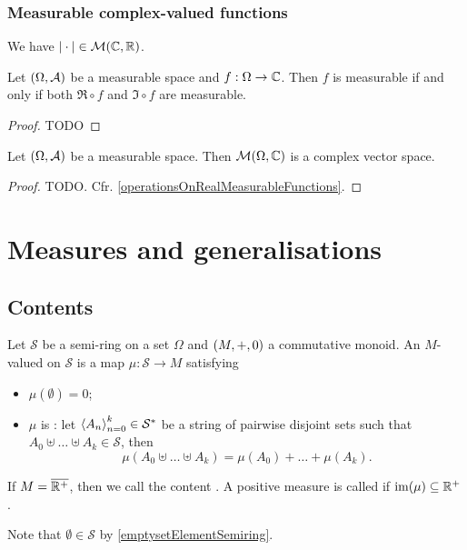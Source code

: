 \subsubsection{Measurable complex-valued functions}

\begin{lemma} \label{modulusMeasurable}
We have $|\cdot| \in \operatorname{\mathcal{M}}(\mathbb{C},\mathbb{R})$.
\end{lemma}

\begin{proposition}
Let $\sSet{\Omega,\mathcal{A}}$ be a measurable space and $f: \Omega \to \mathbb{C}$. Then $f$ is measurable \textup{if and only if} both $\Re\circ f$ and $\Im\circ f$ are measurable.
\end{proposition}
\begin{proof}
TODO
\end{proof}


\begin{proposition}
Let $\sSet{\Omega,\mathcal{A}}$ be a measurable space. Then $\operatorname{\mathcal{M}}(\Omega, \mathbb{C})$ is a complex vector space.
\end{proposition}
\begin{proof}
TODO. Cfr. \ref{operationsOnRealMeasurableFunctions}.
\end{proof}


\section{Measures and generalisations}
\subsection{Contents}
\begin{definition}
Let $\mathcal{S}$ be a semi-ring on a set $\Omega$ and $\sSet{M,+,0}$ a commutative monoid. An $M$-valued  on $\mathcal{S}$ is a map $\mu: \mathcal{S} \to M$ satisfying
\begin{itemize}
\item $\mu(\emptyset) = 0$;
\item $\mu$ is : let $\left\langle A_n \right\rangle_{n=0}^k\in \mathcal{S}^*$ be a string of pairwise disjoint sets such that $A_0 \uplus \ldots \uplus A_{k} \in \mathcal{S}$, then
\[ \mu(A_0 \uplus \ldots \uplus A_{k}) = \mu(A_0) + \ldots + \mu(A_{k}). \]
\end{itemize}
If $M = \overline{\mathbb{R}^+}$, then we call the content . A positive measure is called  if $\operatorname{im}(\mu) \subseteq \mathbb{R}^+$.
\end{definition}
Note that $\emptyset\in \mathcal{S}$ by \ref{emptysetElementSemiring}.


